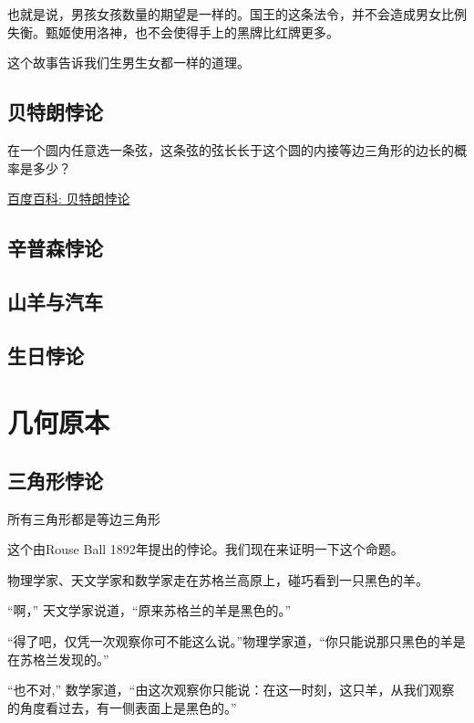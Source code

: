 \documentclass[export, 12pt, letterpaper]{ctexrep}
\newenvironment{shadedquotation}
 {\begin{shaded*}
  \quoting[leftmargin=5pt, rightmargin=5pt, vskip=0pt]
 }
 {\endquoting
 \end{shaded*}
}
\begin{document}
也就是说，男孩女孩数量的期望是一样的。国王的这条法令，并不会造成男女比例失衡。甄姬使用洛神，也不会使得手上的黑牌比红牌更多。

这个故事告诉我们生男生女都一样的道理。


\section{贝特朗悖论}
在一个圆内任意选一条弦，这条弦的弦长长于这个圆的内接等边三角形的边长的概率是多少？

\href{https://baike.baidu.com/item/\%E8\%B4\%9D\%E7\%89\%B9\%E6\%9C\%97\%E6\%82\%96\%E8\%AE\%BA}{百度百科: 贝特朗悖论}


\section{辛普森悖论}


\section{山羊与汽车}


\section{生日悖论}




\chapter{几何原本}


\section{三角形悖论}
\begin{shadedquotation}
\noindent
所有三角形都是等边三角形
\end{shadedquotation}


这个由Rouse Ball 1892年提出的悖论。我们现在来证明一下这个命题。

\begin{center}

\end{center}

\begin{shadedquotation}
\noindent
物理学家、天文学家和数学家走在苏格兰高原上，碰巧看到一只黑色的羊。
\noindent

\noindent
“啊，” 天文学家说道，“原来苏格兰的羊是黑色的。”
\noindent

\noindent
“得了吧，仅凭一次观察你可不能这么说。”物理学家道，“你只能说那只黑色的羊是在苏格兰发现的。”
\noindent

\noindent
“也不对,” 数学家道，“由这次观察你只能说：在这一时刻，这只羊，从我们观察的角度看过去，有一侧表面上是黑色的。”
\end{shadedquotation}
\end{document}
